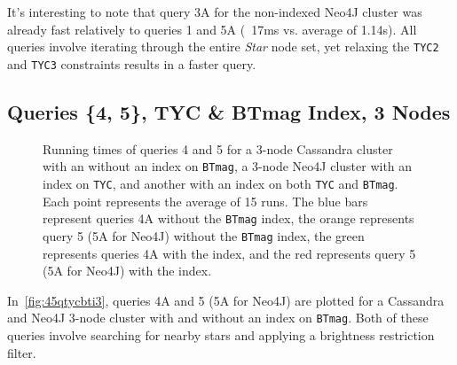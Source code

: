 It's interesting to note that query 3A for the non-indexed Neo4J cluster was already fast relatively to
queries 1 and 5A (~17ms vs. average of 1.14s).
All queries involve iterating through the entire \textit{Star} node set, yet relaxing the
\texttt{TYC2} and \texttt{TYC3} constraints results in a faster query.

\subsection{Queries \{4, 5\}, TYC \& BTmag Index, 3 Nodes}\label{subsec:queries4,5,TycbtmagIndex,3Nodes}
\begin{figure}
    \caption{Running times of queries 4 and 5 for a 3-node Cassandra cluster with an without an index on \texttt{BTmag},
    a 3-node Neo4J cluster with an index on \texttt{TYC}, and another with an index on both \texttt{TYC} and
    \texttt{BTmag}.
    Each point represents the average of 15 runs.
    The blue bars represent queries 4A without the \texttt{BTmag} index, the orange represents query 5 (5A for Neo4J)
    without the \texttt{BTmag} index, the green represents queries 4A with the index, and the red represents query 5
    (5A for Neo4J) with the index.}\label{fig:45qtycbti3}
\end{figure}

In~\autoref{fig:45qtycbti3}, queries 4A and 5 (5A for Neo4J) are plotted for a Cassandra and Neo4J 3-node cluster
with and without an index on \texttt{BTmag}.
Both of these queries involve searching for nearby stars and applying a brightness restriction filter.

